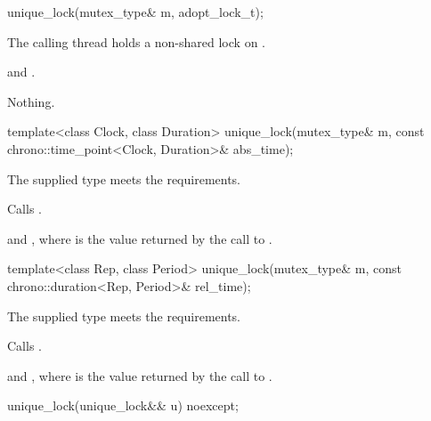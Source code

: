 %
\begin{itemdecl}
unique_lock(mutex_type& m, adopt_lock_t);
\end{itemdecl}

\begin{itemdescr}
\pnum
\expects
The calling thread holds a non-shared lock on .

\pnum
\ensures
{} and .

\pnum
\throws
Nothing.
\end{itemdescr}

%
\begin{itemdecl}
template<class Clock, class Duration>
  unique_lock(mutex_type& m, const chrono::time_point<Clock, Duration>& abs_time);
\end{itemdecl}

\begin{itemdescr}
\pnum
\expects
The supplied  type meets the
 requirements.

\pnum
\effects
Calls .

\pnum
\ensures
{} and ,
where  is
the value returned by the call to .
\end{itemdescr}

%
\begin{itemdecl}
template<class Rep, class Period>
  unique_lock(mutex_type& m, const chrono::duration<Rep, Period>& rel_time);
\end{itemdecl}

\begin{itemdescr}
\pnum
\expects
The supplied  type meets the  requirements.

\pnum
\effects
Calls .

\pnum
\ensures
{} and ,
where  is the value returned by the call to .
\end{itemdescr}

%
\begin{itemdecl}
unique_lock(unique_lock&& u) noexcept;
\end{itemdecl}

